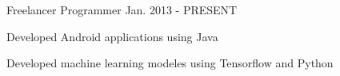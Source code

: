 

\begin{cventries}

  \cventry
      {Freelancer} %
    { Programmer} %
    {} %
    {Jan. 2013 - PRESENT} %
    {
      \begin{cvitems} %
        \item {Developed Android  applications using Java}
        \item {Developed machine learning modeles using Tensorflow and Python}
        \end{cvitems}
    }

 

 

 
 

\end{cventries}
